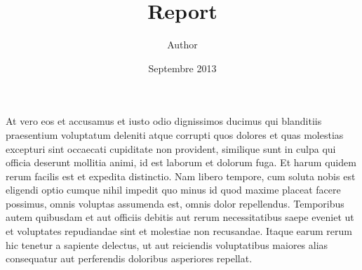 \documentclass{article}
\title{Report}
\author{Author}
\date{Septembre 2013}
\begin{document}
	
	\maketitle

At vero eos et accusamus et iusto odio dignissimos ducimus qui blanditiis praesentium voluptatum deleniti atque corrupti quos dolores et quas molestias excepturi sint occaecati cupiditate non provident, similique sunt in culpa qui officia deserunt mollitia animi, id est laborum et dolorum fuga. Et harum quidem rerum facilis est et expedita distinctio. Nam libero tempore, cum soluta nobis est eligendi optio cumque nihil impedit quo minus id quod maxime placeat facere possimus, omnis voluptas assumenda est, omnis dolor repellendus. Temporibus autem quibusdam et aut officiis debitis aut rerum necessitatibus saepe eveniet ut et voluptates repudiandae sint et molestiae non recusandae. Itaque earum rerum hic tenetur a sapiente delectus, ut aut reiciendis voluptatibus maiores alias consequatur aut perferendis doloribus asperiores repellat.
\end{document}
